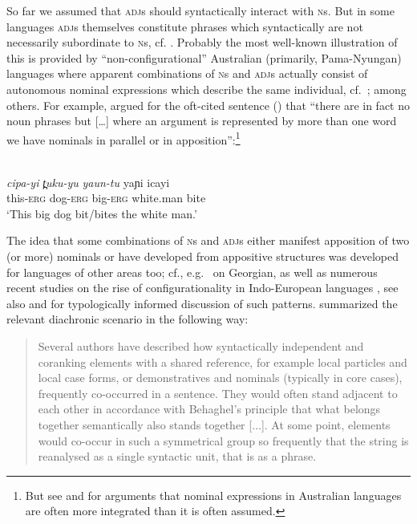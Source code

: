 \documentclass[output=paper
  ,nobabel
  ,draftmode
  ,colorlinks, citecolor=brown
]{langscibook}
\begin{document}
So far we assumed that \textsc{adj}s should syntactically interact with \textsc{n}s. But in some
languages \textsc{adj}s themselves constitute phrases which syntactically are not necessarily
subordinate to \textsc{n}s, cf.  \citet*[13--14]{Riessler2016}. Probably the most well-known
illustration of this is provided by ``non-configurational'' Australian (primarily, Pama-Nyungan)
languages where apparent combinations of \textsc{n}s and \textsc{adj}s actually consist of
autonomous nominal expressions which describe the same individual, cf.\ \citet{Blake1983};
\citet{Heath1984} among others. For example, \citet*[145]{Blake1983} argued for the oft-cited
sentence () that ``there are in fact no noun phrases but [\ldots] where an argument is represented by
more than one word we have nominals in parallel or in apposition'':\footnote{But see \citet{LouagieVerstraete2016} and \citet{Blake2001} for arguments that nominal expressions in Australian languages are often more integrated than it is often assumed.} 


\ea
{}\\
\gll \emph{cipa-yi }      \emph{t̪uku-yu}	\emph{yaun-tu}	yaɲi	       icayi\\ 
     this-\textsc{erg}	dog-\textsc{erg}	big-\textsc{erg}	white.man	bite \\
\glt `This big dog bit/bites the white man.'
\z

\noindent
The idea that some combinations of \textsc{n}s and \textsc{adj}s either manifest apposition of two
(or more) nominals or have developed from appositive structures was developed for languages of other
areas too; cf., e.g.\ \citet*[651-654]{Testelec1998} on Georgian, as well as numerous recent studies
on the rise of configurationality in Indo-European languages \parencites{Luraghi2010, Ledgeway2012,
  Spevak2015, Reinoehl2016}, see also \citet*[19--22]{Rijkhoff2002} and
\citet{LouagieReinoehl2022} for typologically informed discussion of such patterns. \citet*[46]{Reinoehl2016} summarized the relevant diachronic scenario in the following way:

\begin{quote}
    Several authors have described how syntactically independent and coranking elements with a shared reference, for example local particles and local case forms, or demonstratives and nominals (typically in core cases), frequently co-occurred in a sentence. They would often stand adjacent to each other in accordance with Behaghel's principle that what belongs together semantically also stands together [$\dots$]. At some point, elements would co-occur in such a symmetrical group so frequently that the string is reanalysed as a single syntactic unit, that is as a phrase. \citep[46]{Reinoehl2016}
\end{quote}
\end{document}
